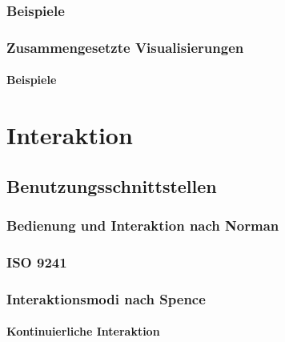             \subsubsection{Beispiele} %

            \subsubsection{Zusammengesetzte Visualisierungen} %

                \paragraph{Beispiele} %

    \section{Interaktion} %

        \subsection{Benutzungsschnittstellen} %

            \subsubsection{Bedienung und Interaktion nach Norman} %

            \subsubsection{ISO 9241} %

            \subsubsection{Interaktionsmodi nach Spence} %

                \paragraph{Kontinuierliche Interaktion} %

